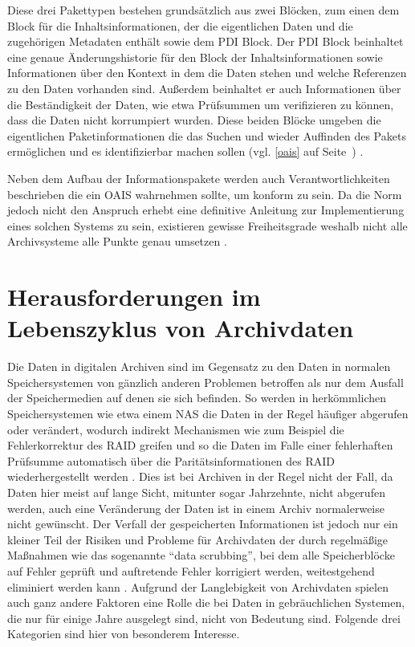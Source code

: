 \documentclass[conference,compsoc,final,a4paper]{IEEEtran}
\begin{document}
Diese drei Pakettypen bestehen grundsätzlich aus zwei Blöcken, zum einen dem Block für die Inhaltsinformationen, der die eigentlichen Daten und die zugehörigen Metadaten enthält sowie dem \ac{PDI} Block. Der \ac{PDI} Block beinhaltet eine genaue Änderungshistorie für den Block der Inhaltsinformationen sowie Informationen über den Kontext in dem die Daten stehen und welche Referenzen zu den Daten vorhanden sind. Außerdem beinhaltet er auch Informationen über die Beständigkeit der Daten, wie etwa Prüfsummen um verifizieren zu können, dass die Daten nicht korrumpiert wurden. Diese beiden Blöcke umgeben die eigentlichen Paketinformationen die das Suchen und wieder Auffinden des Pakets ermöglichen und es identifizierbar machen sollen (vgl. \autoref{oais} auf Seite~\pageref{oais}) \autocite{Ball2006}.

Neben dem Aufbau der Informationspakete werden auch Verantwortlichkeiten beschrieben die ein \ac{OAIS} wahrnehmen sollte, um konform zu sein. Da die Norm jedoch nicht den Anspruch erhebt eine definitive Anleitung zur Implementierung eines solchen Systems zu sein, existieren gewisse Freiheitsgrade weshalb nicht alle Archivsysteme alle Punkte genau umsetzen \autocite{Ball2006}.

\section{Herausforderungen im Lebenszyklus von Archivdaten}
Die Daten in digitalen Archiven sind im Gegensatz zu den Daten in normalen Speichersystemen von gänzlich anderen Problemen betroffen als nur dem Ausfall der Speichermedien auf denen sie sich befinden. So werden in herkömmlichen Speichersystemen wie etwa einem \ac{NAS} die Daten in der Regel häufiger abgerufen oder verändert, wodurch indirekt Mechanismen wie zum Beispiel die Fehlerkorrektur des \ac{RAID} greifen und so die Daten im Falle einer fehlerhaften Prüfsumme automatisch über die Paritätsinformationen des \ac{RAID} wiederhergestellt werden \autocite{Lakshmi2008}. Dies ist bei Archiven in der Regel nicht der Fall, da Daten hier meist auf lange Sicht, mitunter sogar Jahrzehnte, nicht abgerufen werden, auch eine Veränderung der Daten ist in einem Archiv normalerweise nicht gewünscht. Der Verfall der gespeicherten Informationen ist jedoch nur ein kleiner Teil der Risiken und Probleme für Archivdaten der durch regelmäßige Maßnahmen wie das sogenannte ``data scrubbing'', bei dem alle Speicherblöcke auf Fehler geprüft und auftretende Fehler korrigiert werden, weitestgehend eliminiert werden kann \autocite{Lakshmi2008}. Aufgrund der Langlebigkeit von Archivdaten spielen auch ganz andere Faktoren eine Rolle die bei Daten in gebräuchlichen Systemen, die nur für einige Jahre ausgelegt sind, nicht von Bedeutung sind. Folgende drei Kategorien sind hier von besonderem Interesse.
\end{document}
